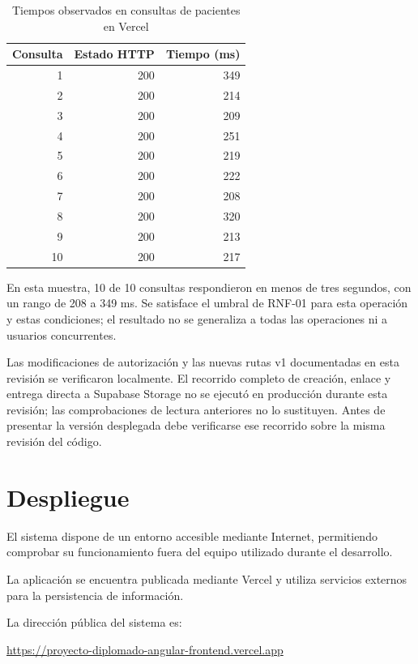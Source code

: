 \begin{table}[H]\centering
\caption{Tiempos observados en consultas de pacientes en Vercel}
\begin{tabular}{rrr}\toprule
\textbf{Consulta}&\textbf{Estado HTTP}&\textbf{Tiempo (ms)}\\\midrule
1&200&349\\
2&200&214\\
3&200&209\\
4&200&251\\
5&200&219\\
6&200&222\\
7&200&208\\
8&200&320\\
9&200&213\\
10&200&217\\
\bottomrule\end{tabular}\end{table}
En esta muestra, 10 de 10 consultas respondieron en menos de tres
segundos, con un rango de 208 a 349 ms.
Se satisface el umbral de RNF-01 para esta operación y estas condiciones;
el resultado no se generaliza a todas las operaciones ni a usuarios concurrentes.

Las modificaciones de autorización y las nuevas rutas v1 documentadas en esta
revisión se verificaron localmente. El recorrido completo de creación,
enlace y entrega directa a Supabase Storage no se ejecutó en producción
durante esta revisión; las comprobaciones de lectura anteriores no lo
sustituyen. Antes de presentar la versión desplegada debe verificarse ese
recorrido sobre la misma revisión del código.

\section{Despliegue}

El sistema dispone de un entorno accesible mediante Internet, permitiendo
comprobar su funcionamiento fuera del equipo utilizado durante el
desarrollo.

La aplicación se encuentra publicada mediante Vercel y utiliza servicios
externos para la persistencia de información.

La dirección pública del sistema es:

\begin{center}
	
	\url{
		https://proyecto-diplomado-angular-frontend.vercel.app
	}
	
\end{center}

